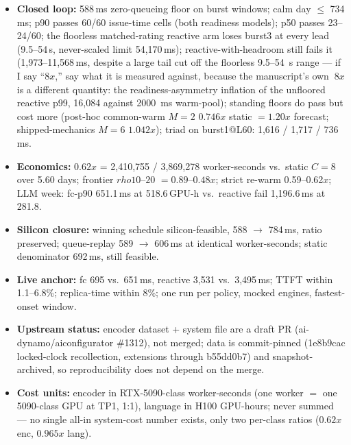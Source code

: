 \documentclass[11pt,a4paper]{article}
\def\times{x}\def\rho{rho}\def\approx{~}\def\leq{<=}\def\geq{>=}%
\def\emph#1{#1}\def\texttt#1{#1}%
\begin{document}
\begin{itemize}
{  timing} --- $s{=}2$ under the calibrated AIC timing that decides the
  verdicts); 235B@TP8 knee one
  octave below 8B (ITL-bound, 87.7\,ms at trace rate).
\item \textbf{Closed loop:} 588\,ms zero-queueing floor on burst windows;
  calm day $\le$ 734\,ms; p90 passes 60/60 issue-time cells (both readiness
  models); p50 passes 23--24/60; the floorless matched-rating reactive arm
  loses burst3 at every lead (9.5--54\,s,
  never-scaled limit 54{,}170\,ms); reactive-with-headroom still fails it
  (1{,}973--11{,}568\,ms, despite a large tail cut off the floorless
  9.5--\SI{54}{\second} range --- if I say ``$8\times$,'' say what it is
  measured against, because the manuscript's own ${\approx}8\times$ is a
  \emph{different} quantity: the readiness-asymmetry inflation of the
  unfloored reactive p99, 16{,}084 against \SI{2000}{\milli\second}
  warm-pool); standing floors
  do pass but cost more (post-hoc common-warm $M{=}2$ $0.746\times$ static
  $=1.20\times$ forecast; shipped-mechanics $M{=}6$ $1.042\times$); triad on
  burst1@L60: 1{,}616 / 1{,}717 / 736\,ms.
\item \textbf{Economics:} $0.62\times$ = 2{,}410{,}755 / 3{,}869{,}278
  worker-seconds vs.\ static $C{=}8$ over 5.60 days; frontier $\rho10$--$20$
  $= 0.89$--$0.48\times$; strict re-warm 0.59--0.62$\times$; LLM week: fc-p90
  651.1\,ms at 518.6\,GPU-h vs.\ reactive fail 1{,}196.6\,ms at 281.8.
\item \textbf{Silicon closure:} winning schedule silicon-feasible, 588 $\to$
  784\,ms, ratio preserved; queue-replay 589 $\to$ 606\,ms at identical
  worker-seconds; static denominator 692\,ms, still feasible.
\item \textbf{Live anchor:} fc 695 vs.\ 651\,ms, reactive 3{,}531 vs.\
  3{,}495\,ms; TTFT within 1.1--6.8\%; replica-time within 8\%; one run per
  policy, mocked engines, fastest-onset window.
\item \textbf{Upstream status:} encoder dataset + system file are a
  \emph{draft} PR (ai-dynamo/aiconfigurator \#1312), \emph{not merged\nocorr};
  data is commit-pinned (\texttt{1e8b9cac} locked-clock recollection,
  extensions through \texttt{b55dd0b7}) and snapshot-archived, so
  reproducibility does not depend on the merge.
\item \textbf{Cost units:} encoder in RTX-5090-class \emph{worker}-seconds
  (one worker $=$ one 5090-class GPU at TP1, 1:1), language in H100
  GPU-hours; never summed --- no single all-in system-cost number exists,
  only two per-class ratios ($0.62\times$ enc, $0.965\times$ lang).

\end{itemize}
\end{document}
